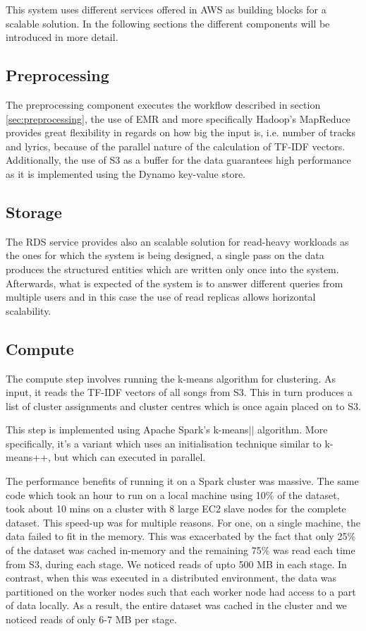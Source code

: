 \documentclass[10pt,a4paper, twocolumn]{article}
\begin{document}
  This system uses different services offered in AWS as building blocks for a
  scalable solution. In the following sections the different components will
  be introduced in more detail.
  
  \subsection{Preprocessing}

  The preprocessing component executes the workflow described in section
  \ref{sec:preprocessing}, the use of EMR and more specifically Hadoop's
  MapReduce provides great flexibility in regards on how big the input is, i.e.
  number of tracks and lyrics, because of the parallel nature of the
  calculation of TF-IDF vectors. Additionally, the use of S3 as a buffer for
  the data guarantees high performance as it is implemented using the Dynamo
  key-value store.
  
  \subsection{Storage}
  
  The RDS service provides also an scalable solution for read-heavy workloads
  as the ones for which the system is being designed, a single pass on the data
  produces the structured entities which are written only once into the system.
  Afterwards, what is expected of the system is to answer different queries from
  multiple users and in this case the use of read replicas allows horizontal
  scalability.
  
  \subsection{Compute}
 
  The compute step involves running the k-means algorithm for clustering.
  As input, it reads the TF-IDF vectors of all songs from S3.
  This in turn produces a list of cluster assignments and cluster centres which is 
  once again placed on to S3.
  
  This step is implemented using Apache Spark's k-means$||$ algorithm.
  More specifically, it's a variant which uses an initialisation technique similar to k-means++,
  but which can executed in parallel.
  
  The performance benefits of running it on a Spark cluster was massive.
  The same code which took an hour to run on a local machine using 10\% of the dataset,
  took about 10 mins on a cluster with 8 large EC2 slave nodes for the complete dataset.
  This speed-up was for multiple reasons.
  For one, on a single machine, the data failed to fit in the memory.
  This was exacerbated by the fact that only 25\% of the dataset was cached in-memory and
  the remaining 75\% was read each time from S3, during each stage.
  We noticed reads of upto 500 MB in each stage.
  In contrast, when this was executed in a distributed environment, the data was partitioned on
  the worker nodes such that each worker node had access to a part of data locally.
  As a result, the entire dataset was cached in the cluster and we noticed reads of only
  6-7 MB per stage.
  
\end{document}
